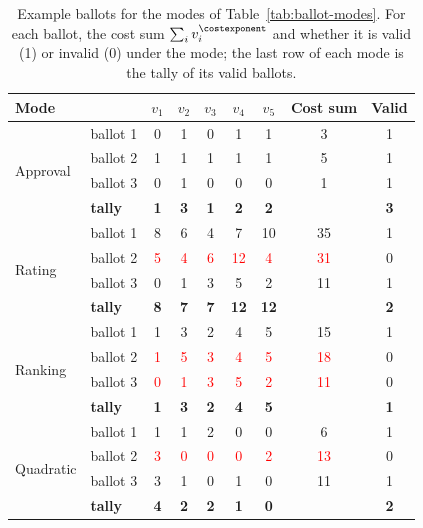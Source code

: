 \begin{table}[h]
	\centering
	\caption{Example ballots for the modes of Table~\ref{tab:ballot-modes}. For each ballot, the cost sum $\sum_i v_i^{\costexponent}$ and whether it is valid (1) or invalid (0) under the mode; the last row of each mode is the tally of its valid ballots.}
	\label{tab:ballot-examples}
	\footnotesize
	\begin{tabular}{l l ccccc c c}
		\toprule
		\textbf{Mode} & & $v_1$ & $v_2$ & $v_3$ & $v_4$ & $v_5$ & \textbf{Cost sum} & \textbf{Valid} \\
		\midrule
		\multirow{4}{*}{Approval} & ballot 1 & 0 & 1 & 0 & 1 & 1 & 3 & 1 \\
		 & ballot 2 & 1 & 1 & 1 & 1 & 1 & 5 & 1 \\
		 & ballot 3 & 0 & 1 & 0 & 0 & 0 & 1 & 1 \\
		& \textbf{tally} & \textbf{1} & \textbf{3} & \textbf{1} & \textbf{2} & \textbf{2} & & \textbf{3} \\
		\midrule
		\multirow{4}{*}{Rating} & ballot 1 & 8 & 6 & 4 & 7 & 10 & 35 & 1 \\
		 & ballot 2 & \textcolor{red}{5} & \textcolor{red}{4} & \textcolor{red}{6} & \textcolor{red}{12} & \textcolor{red}{4} & \textcolor{red}{31} & 0 \\
		 & ballot 3 & 0 & 1 & 3 & 5 & 2 & 11 & 1 \\
		& \textbf{tally} & \textbf{8} & \textbf{7} & \textbf{7} & \textbf{12} & \textbf{12} & & \textbf{2} \\
		\midrule
		\multirow{4}{*}{Ranking} & ballot 1 & 1 & 3 & 2 & 4 & 5 & 15 & 1 \\
		 & ballot 2 & \textcolor{red}{1} & \textcolor{red}{5} & \textcolor{red}{3} & \textcolor{red}{4} & \textcolor{red}{5} & \textcolor{red}{18} & 0 \\
		 & ballot 3 & \textcolor{red}{0} & \textcolor{red}{1} & \textcolor{red}{3} & \textcolor{red}{5} & \textcolor{red}{2} & \textcolor{red}{11} & 0 \\
		& \textbf{tally} & \textbf{1} & \textbf{3} & \textbf{2} & \textbf{4} & \textbf{5} & & \textbf{1} \\
		\midrule
		\multirow{4}{*}{Quadratic} & ballot 1 & 1 & 1 & 2 & 0 & 0 & 6 & 1 \\
		 & ballot 2 & \textcolor{red}{3} & \textcolor{red}{0} & \textcolor{red}{0} & \textcolor{red}{0} & \textcolor{red}{2} & \textcolor{red}{13} & 0 \\
		 & ballot 3 & 3 & 1 & 0 & 1 & 0 & 11 & 1 \\
		& \textbf{tally} & \textbf{4} & \textbf{2} & \textbf{2} & \textbf{1} & \textbf{0} & & \textbf{2} \\

\end{tabular}
\end{table}
